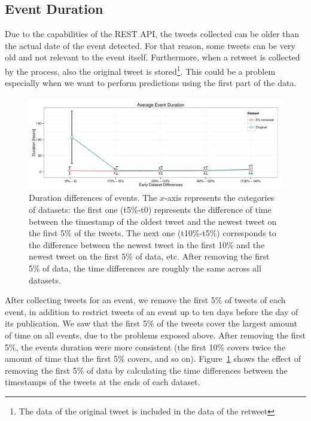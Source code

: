 \subsection{Event Duration}\label{sub:dur}

Due to the capabilities of the REST API, the tweets collected can be older than
the actual date of the event detected. 
%
For that reason, some tweets can be very old and not relevant to the event
itself. 
%
Furthermore, when a retweet is collected by the process, also the original tweet
is stored\footnote{The data of the original tweet is included in the data of the
retweet}. 
%
This could be a problem especially when we want to perform predictions using the
first part of the data. 


\begin{figure}
\centering
\includegraphics[width=\textwidth]{figures/data/duration-differences.pdf}
\caption[Duration differences of events.]{Duration differences of events. The
  $x$-axis represents the categories of datasets: the first one (t5\%-t0)
  represents the difference of time between the timestamp of the oldest tweet
  and the newest tweet on the first 5\% of the tweets. The next one (t10\%-t5\%)
  corresponds to the difference between the newest tweet in the first 10\% and
  the newest tweet on the first 5\% of data, etc. After removing the first 5\%
  of data, the time differences are roughly the same across all
  datasets.}\label{fig:duration-differences}

\end{figure}

After collecting tweets for an event, we remove the first 5\% of tweets of each
event, in addition to restrict tweets of an event up to ten days before the day
of its publication. 
%
We saw that the first 5\% of the tweets cover the largest amount of time on all
events, due to the problems exposed above. 
%
After removing the first 5\%, the events duration were more consistent (the
first 10\% covers twice the amount of time that the first 5\% covers, and so
on). 
%
Figure~\ref{fig:duration-differences} shows the effect of removing the first 5\%
of data by calculating the time differences between the timestamps of the tweets
at the ends of each dataset.


